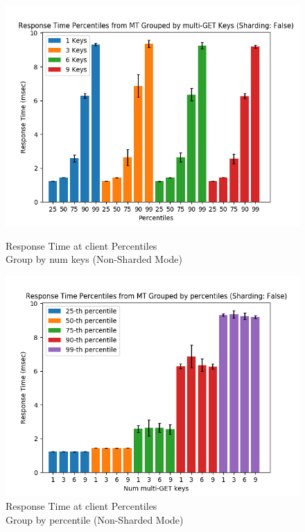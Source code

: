\documentclass[11pt,a4paper]{article}
\begin{document}
	\begin{figure}[H]
		\captionsetup{font=scriptsize,labelfont=scriptsize,justification=centering}
		\centering
		\begin{minipage}{0.5\textwidth}
			\centering
			\includegraphics[scale=0.5]{images/5_shard_False_percentiles_group_by_keys_mt.png}
			\caption{Response Time at client Percentiles \\ Group by num keys (Non-Sharded Mode)}
		\end{minipage}\hfill
		\begin{minipage}{0.5\textwidth}
			\centering
			\includegraphics[scale=0.5]{images/5_shard_False_percentiles_group_by_percentile_mt.png}
			\caption{Response Time at client Percentiles \\ Group by percentile (Non-Sharded Mode)}
		\end{minipage}
	\end{figure}
\end{document}
